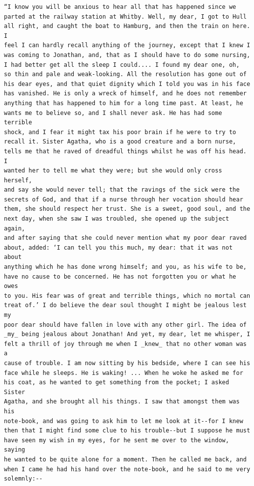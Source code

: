 \documentclass{article}
\begin{document}
\begin{verbatim}
“I know you will be anxious to hear all that has happened since we
parted at the railway station at Whitby. Well, my dear, I got to Hull
all right, and caught the boat to Hamburg, and then the train on here. I
feel I can hardly recall anything of the journey, except that I knew I
was coming to Jonathan, and, that as I should have to do some nursing,
I had better get all the sleep I could.... I found my dear one, oh,
so thin and pale and weak-looking. All the resolution has gone out of
his dear eyes, and that quiet dignity which I told you was in his face
has vanished. He is only a wreck of himself, and he does not remember
anything that has happened to him for a long time past. At least, he
wants me to believe so, and I shall never ask. He has had some terrible
shock, and I fear it might tax his poor brain if he were to try to
recall it. Sister Agatha, who is a good creature and a born nurse,
tells me that he raved of dreadful things whilst he was off his head. I
wanted her to tell me what they were; but she would only cross herself,
and say she would never tell; that the ravings of the sick were the
secrets of God, and that if a nurse through her vocation should hear
them, she should respect her trust. She is a sweet, good soul, and the
next day, when she saw I was troubled, she opened up the subject again,
and after saying that she could never mention what my poor dear raved
about, added: ‘I can tell you this much, my dear: that it was not about
anything which he has done wrong himself; and you, as his wife to be,
have no cause to be concerned. He has not forgotten you or what he owes
to you. His fear was of great and terrible things, which no mortal can
treat of.’ I do believe the dear soul thought I might be jealous lest my
poor dear should have fallen in love with any other girl. The idea of
_my_ being jealous about Jonathan! And yet, my dear, let me whisper, I
felt a thrill of joy through me when I _knew_ that no other woman was a
cause of trouble. I am now sitting by his bedside, where I can see his
face while he sleeps. He is waking! ... When he woke he asked me for
his coat, as he wanted to get something from the pocket; I asked Sister
Agatha, and she brought all his things. I saw that amongst them was his
note-book, and was going to ask him to let me look at it--for I knew
then that I might find some clue to his trouble--but I suppose he must
have seen my wish in my eyes, for he sent me over to the window, saying
he wanted to be quite alone for a moment. Then he called me back, and
when I came he had his hand over the note-book, and he said to me very
solemnly:--


\end{verbatim}
\end{document}
